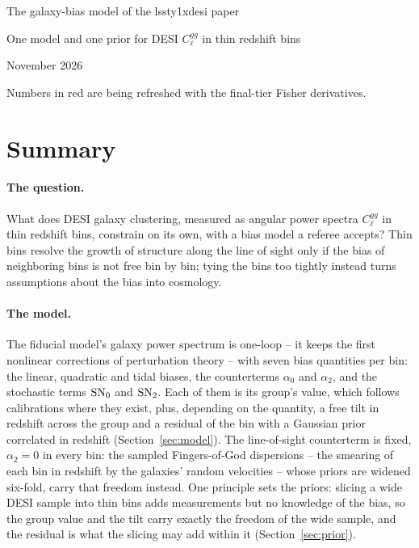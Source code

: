 \documentclass[11pt]{article}
\newcommand{\SNz}{{\rm SN}_0}
\newcommand{\SNt}{{\rm SN}_2}
\newif\ifnumbersfinal
\newcommand{\SigVfactor}{six}
\begin{document}
\begin{center}
  {\LARGE The galaxy-bias model of the lssty1xdesi paper\par}
  \vspace{0.6em}
  {\large One model and one prior for DESI $C_\ell^{gg}$ in thin
    redshift bins\par}
  \vspace{0.6em}
  {\large November 2026\par}
  \ifnumbersfinal\else
    \vspace{0.6em}
    {\color{red}Numbers in red are being refreshed with the final-tier
      Fisher derivatives.\par}
  \fi
\end{center}
\vspace{1em}

\section{Summary}
\label{sec:summary}

\paragraph{The question.}
What does DESI galaxy clustering, measured as angular power spectra
$C_\ell^{gg}$ in thin redshift bins, constrain on its own, with a bias
model a referee accepts?  Thin bins resolve the growth of structure
along the line of sight only if the bias of neighboring bins is not
free bin by bin; tying the bins too tightly instead turns assumptions
about the bias into cosmology.

\paragraph{The model.}
The fiducial model's galaxy power spectrum is one-loop -- it keeps
the first nonlinear corrections of perturbation theory -- with seven
bias quantities per bin: the linear, quadratic and tidal biases, the counterterms
$\alpha_0$ and $\alpha_2$, and the stochastic terms $\SNz$ and $\SNt$.
Each of them is its group's value, which follows calibrations where
they exist, plus, depending on the quantity, a free tilt in redshift
across the group and a residual of the bin with a Gaussian prior
correlated in redshift (Section~\ref{sec:model}).  The line-of-sight
counterterm is fixed, $\alpha_2 = 0$ in every bin: the sampled
Fingers-of-God dispersions -- the smearing of each bin in redshift by
the galaxies' random velocities -- whose priors are widened
\SigVfactor{}-fold, carry that freedom instead.  One principle sets
the priors: slicing a wide DESI sample into thin bins adds measurements
but no knowledge of the bias, so the group value and the tilt carry
exactly the freedom of the wide sample, and the residual is what the
slicing may add within it (Section~\ref{sec:prior}).
\end{document}
